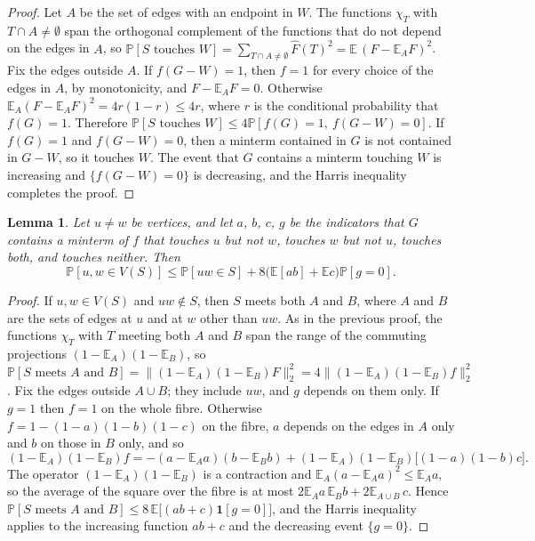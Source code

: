 \documentclass[11pt]{amsart}
\newtheorem{lemma}[theorem]{Lemma}
\theoremstyle{remark}
\newcommand{\E}{\mathbb{E}}
\renewcommand{\Pr}{\mathbb{P}}
\begin{document}
\begin{proof}
Let $A$ be the set of edges with an endpoint in $W$. The functions $\chi_T$ with $T\cap A\ne\emptyset$ span the
orthogonal complement of the functions that do not depend on the edges in $A$, so
$\Pr[S\text{ touches }W]=\sum_{T\cap A\ne\emptyset}\widehat F(T)^2=\E\,(F-\E_AF)^2$. Fix the edges outside $A$. If
$f(G-W)=1$, then $f=1$ for every choice of the edges in $A$, by monotonicity, and $F-\E_AF=0$. Otherwise
$\E_A(F-\E_AF)^2=4r(1-r)\le4r$, where $r$ is the conditional probability that $f(G)=1$. Therefore
$\Pr[S\text{ touches }W]\le4\Pr[f(G)=1,\ f(G-W)=0]$. If $f(G)=1$ and $f(G-W)=0$, then a minterm contained in $G$
is not contained in $G-W$, so it touches $W$. The event that $G$ contains a minterm touching $W$ is increasing and
$\{f(G-W)=0\}$ is decreasing, and the Harris inequality~\cite{Har60} completes the proof.
\end{proof}

\begin{lemma}\label{lem:pairs}
Let $u\neq w$ be vertices, and let $a$, $b$, $c$, $g$ be the indicators that $G$ contains a minterm of $f$ that touches
$u$ but not $w$, touches $w$ but not $u$, touches both, and touches neither. Then
\[
\Pr[u,w\in V(S)]\le\Pr[uw\in S]+8\bigl(\E[ab]+\E c\bigr)\Pr[g=0].
\]
\end{lemma}

\begin{proof}
If $u,w\in V(S)$ and $uw\notin S$, then $S$ meets both $A$ and $B$, where $A$ and $B$ are the sets of edges at $u$ and
at $w$ other than $uw$. As in the previous proof, the functions $\chi_T$ with $T$ meeting both $A$ and $B$ span the
range of the commuting projections $(1-\E_A)(1-\E_B)$, so
$\Pr[S\text{ meets $A$ and $B$}]=\|(1-\E_A)(1-\E_B)F\|_2^2=4\|(1-\E_A)(1-\E_B)f\|_2^2$. Fix the edges outside
$A\cup B$; they include $uw$, and $g$ depends on them only. If $g=1$ then $f=1$ on the whole fibre. Otherwise
$f=1-(1-a)(1-b)(1-c)$ on the fibre, $a$ depends on the edges in $A$ only and $b$ on those in $B$ only, and so
\[
(1-\E_A)(1-\E_B)f=-(a-\E_Aa)(b-\E_Bb)+(1-\E_A)(1-\E_B)\bigl[(1-a)(1-b)c\bigr].
\]
The operator $(1-\E_A)(1-\E_B)$ is a contraction and $\E_A(a-\E_Aa)^2\le\E_Aa$, so the average of the square over the
fibre is at most $2\E_Aa\,\E_Bb+2\E_{A\cup B}\,c$. Hence
$\Pr[S\text{ meets $A$ and $B$}]\le8\,\E\bigl[(ab+c)\mathbf 1[g=0]\bigr]$, and the Harris inequality applies to the
increasing function $ab+c$ and the decreasing event $\{g=0\}$.
\end{proof}
\end{document}
